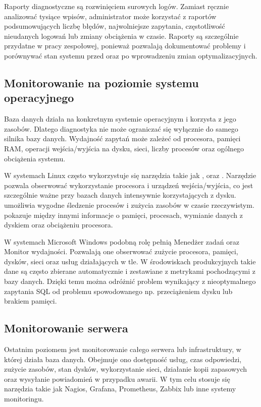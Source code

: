 \documentclass[a4paper,11pt,english,openany,oneside]{sphinxmanual}
\begin{document}
\sphinxAtStartPar
Raporty diagnostyczne są rozwinięciem surowych logów. Zamiast ręcznie analizować tysiące wpisów, administrator może korzystać z raportów podsumowujących liczbę błędów, najwolniejsze zapytania, częstotliwość nieudanych logowań lub zmiany obciążenia w czasie. Raporty są szczególnie przydatne w pracy zespołowej, ponieważ pozwalają dokumentować problemy i porównywać stan systemu przed oraz po wprowadzeniu zmian optymalizacyjnych.


\subsection{Monitorowanie na poziomie systemu operacyjnego}
\label{\detokenize{rozdzial_2/rozdzial_24/index:monitorowanie-na-poziomie-systemu-operacyjnego}}
\sphinxAtStartPar
Baza danych działa na konkretnym systemie operacyjnym i korzysta z jego zasobów. Dlatego diagnostyka nie może ograniczać się wyłącznie do samego silnika bazy danych. Wydajność zapytań może zależeć od procesora, pamięci RAM, operacji wejścia/wyjścia na dysku, sieci, liczby procesów oraz ogólnego obciążenia systemu.

\sphinxAtStartPar
W systemach Linux często wykorzystuje się narzędzia takie jak ,  oraz . Narzędzie  pozwala obserwować wykorzystanie procesora i urządzeń wejścia/wyjścia, co jest szczególnie ważne przy bazach danych intensywnie korzystających z dysku.  umożliwia wygodne śledzenie procesów i zużycia zasobów w czasie rzeczywistym.  pokazuje między innymi informacje o pamięci, procesach, wymianie danych z dyskiem oraz obciążeniu procesora.

\sphinxAtStartPar
W systemach Microsoft Windows podobną rolę pełnią Menedżer zadań oraz Monitor wydajności. Pozwalają one obserwować zużycie procesora, pamięci, dysków, sieci oraz usług działających w tle. W środowiskach produkcyjnych takie dane są często zbierane automatycznie i zestawiane z metrykami pochodzącymi z bazy danych. Dzięki temu można odróżnić problem wynikający z nieoptymalnego zapytania SQL od problemu spowodowanego np. przeciążeniem dysku lub brakiem pamięci.


\subsection{Monitorowanie serwera}
\label{\detokenize{rozdzial_2/rozdzial_24/index:monitorowanie-serwera}}
\sphinxAtStartPar
Ostatnim poziomem jest monitorowanie całego serwera lub infrastruktury, w której działa baza danych. Obejmuje ono dostępność usług, czas odpowiedzi, zużycie zasobów, stan dysków, wykorzystanie sieci, działanie kopii zapasowych oraz wysyłanie powiadomień w przypadku awarii. W tym celu stosuje się narzędzia takie jak Nagios, Grafana, Prometheus, Zabbix lub inne systemy monitoringu.
\end{document}
